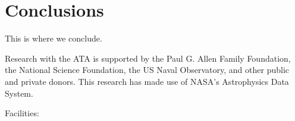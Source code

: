 \documentclass[preprint]{aastex}
\begin{document}
\section{Conclusions}\label{s.conclusions}
This is where we conclude.


\acknowledgments
Research with the ATA is supported by the Paul G. Allen Family
Foundation, the National Science Foundation, the US Naval Observatory,
and other public and private donors. This research has made use of
NASA's Astrophysics Data System.

Facilities: 



\end{document}
